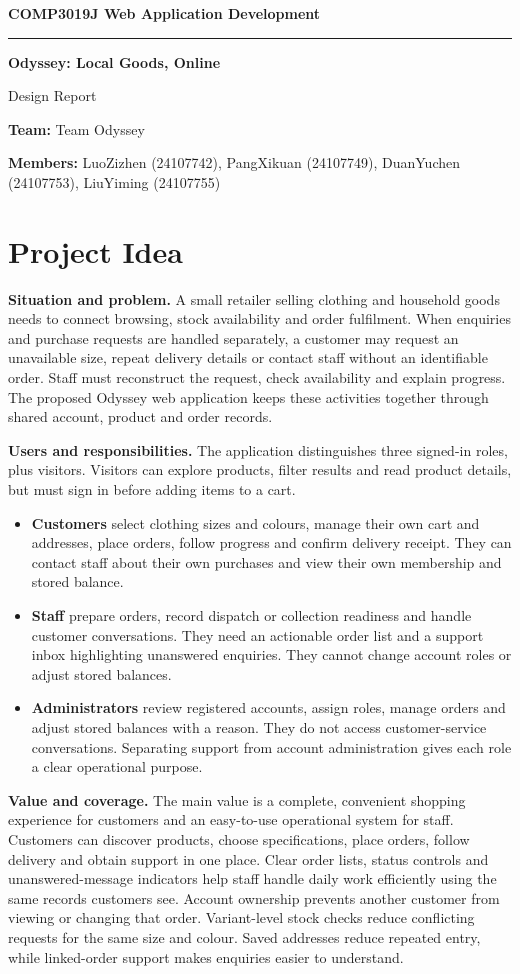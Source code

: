 \documentclass[11pt,a4paper]{article}
\newcommand{\reportheader}[3]{%
\begin{center}
{\small\bfseries COMP3019J Web Application Development}\par
\vspace{2pt}\hrule\vspace{9pt}
{\LARGE\bfseries #1}\par
\vspace{2pt}Design Report
\end{center}
{\small\textbf{Team:} #2\par
\textbf{Members:} #3\par}
\vspace{3pt}}
\begin{document}
\reportheader{Odyssey: Local Goods, Online}{Team Odyssey}
{LuoZizhen (24107742), PangXikuan (24107749), DuanYuchen (24107753), LiuYiming (24107755)}

\section{Project Idea}
\textbf{Situation and problem.} A small retailer selling clothing and household goods needs to connect browsing, stock availability and order fulfilment. When enquiries and purchase requests are handled separately, a customer may request an unavailable size, repeat delivery details or contact staff without an identifiable order. Staff must reconstruct the request, check availability and explain progress. The proposed Odyssey web application keeps these activities together through shared account, product and order records.

\textbf{Users and responsibilities.} The application distinguishes three signed-in roles, plus visitors. Visitors can explore products, filter results and read product details, but must sign in before adding items to a cart.
\begin{itemize}
\item \textbf{Customers} select clothing sizes and colours, manage their own cart and addresses, place orders, follow progress and confirm delivery receipt. They can contact staff about their own purchases and view their own membership and stored balance.
\item \textbf{Staff} prepare orders, record dispatch or collection readiness and handle customer conversations. They need an actionable order list and a support inbox highlighting unanswered enquiries. They cannot change account roles or adjust stored balances.
\item \textbf{Administrators} review registered accounts, assign roles, manage orders and adjust stored balances with a reason. They do not access customer-service conversations. Separating support from account administration gives each role a clear operational purpose.
\end{itemize}

\textbf{Value and coverage.} The main value is a complete, convenient shopping experience for customers and an easy-to-use operational system for staff. Customers can discover products, choose specifications, place orders, follow delivery and obtain support in one place. Clear order lists, status controls and unanswered-message indicators help staff handle daily work efficiently using the same records customers see. Account ownership prevents another customer from viewing or changing that order. Variant-level stock checks reduce conflicting requests for the same size and colour. Saved addresses reduce repeated entry, while linked-order support makes enquiries easier to understand.
\end{document}
